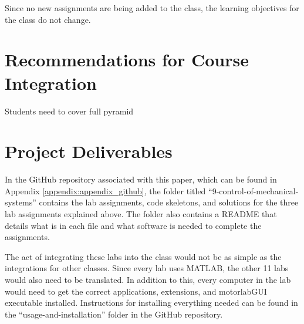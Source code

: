 Since no new assignments are being added to the class, the learning objectives for the class do not change.

\section{Recommendations for Course Integration}

Students need to cover full pyramid

\section{Project Deliverables}

In the GitHub repository associated with this paper, which can be found in Appendix \ref{appendix:appendix_github},
the folder titled ``9-control-of-mechanical-systems'' contains the lab assignments, code skeletons, and solutions for the three
lab assignments explained above. The folder also contains a README that details what is in each file and what software is needed 
to complete the assignments. 

The act of integrating these labs into the class would not be as simple as the integrations for other classes. Since every lab 
uses MATLAB, the other 11 labs would also need to be translated. In addition to this, every computer in the lab would need to 
get the correct applications, extensions, and motorlabGUI executable installed. Instructions for installing everything needed 
can be found in the ``usage-and-installation'' folder in the GitHub repository.
